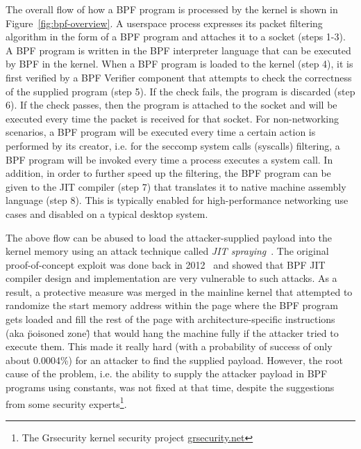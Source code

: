 The overall flow of how a BPF program is processed by the kernel is shown in Figure~\ref{fig:bpf-overview}.  
A userspace process expresses its packet filtering algorithm in the form of a BPF program and attaches it to a socket (steps 1-3). A BPF program is written in the BPF interpreter language that can be executed by BPF in the kernel. When a BPF program is loaded to the kernel (step 4), it is first verified by a BPF Verifier component that attempts to check the correctness of the supplied program (step 5). If the check fails, the program is discarded (step 6). If the check passes, then the program is attached to the socket and will be executed every time the packet is received for that socket. For non-networking scenarios, a BPF program will be executed every time a certain action is performed by its creator, i.e. for the seccomp system calls (syscalls) filtering, a BPF program will be invoked every time a process executes a system call. In addition, in order to further speed up the filtering, the BPF program can be given to the JIT compiler (step 7) that translates it to native machine assembly language (step 8). This is typically enabled for high-performance networking use cases and disabled on a typical desktop system.  

The above flow can be abused to load the attacker-supplied payload into the kernel memory using an attack technique called \textit{JIT spraying}~\cite{blazakis2010, bania2010jit}. The original proof-of-concept exploit was done back in 2012~\cite{mcallister2012attacking} and showed that BPF JIT compiler design and implementation are very vulnerable to such attacks. As a result, a protective measure was merged in the mainline kernel that attempted to randomize the start memory address within the page where the BPF program gets loaded and fill the rest of the page with architecture-specific instructions (aka \"poisoned zone\") that would hang the machine fully if the attacker tried to execute them. This made it really hard (with a probability of success of only about 0.0004\%) for an attacker to find the supplied payload. However, the root cause of the problem, i.e. the ability to supply the attacker payload in BPF programs using constants, was not fixed at that time, despite the suggestions from some security experts\footnote{The Grsecurity kernel security project \url{grsecurity.net}}.

